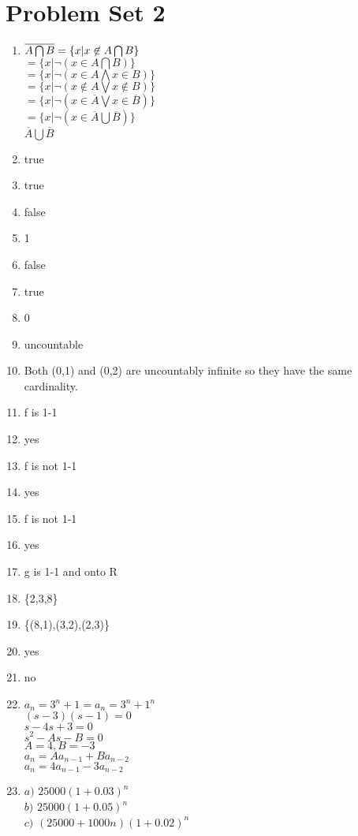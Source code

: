 \documentclass[11pt]{article}
\begin{document}
\section{Problem Set 2}
\begin{enumerate}
\item $\overline{A \bigcap B} \\= \lbrace x | x \not\in A \bigcap B\rbrace$
\\$= \lbrace x | \lnot(x \in A \bigcap B)\rbrace$
\\$= \lbrace x | \lnot(x \in A \bigwedge x \in B)\rbrace$
\\$= \lbrace x | \lnot(x \not\in A \bigvee x \not\in B)\rbrace$
\\$= \lbrace x | \lnot(x \in \overline{A} \bigvee x \in \overline{B})\rbrace$
\\$= \lbrace x | \lnot(x \in \overline{A} \bigcup \overline{B})\rbrace$
\\$\overline{A} \bigcup \overline{B}$
\item true
\item true
\item false
\item 1
\item false
\item true
\item 0
\item uncountable
\item Both (0,1) and (0,2) are uncountably infinite so they have the same cardinality.
\item f is 1-1
\item yes
\item f is not 1-1
\item yes
\item f is not 1-1
\item yes
\item g is 1-1 and onto R
\item \{2,3,8\}
\item \{(8,1),(3,2),(2,3)\}
\item yes
\item no
\item $a_n = 3^n + 1 = a_n = 3^n + 1^n$\\
$(s-3)(s-1) = 0$\\
$s-4s+3=0$\\
$s^2-As-B = 0$\\
$A=4,B=-3$\\
$a_n = Aa_{n-1} + Ba_{n-2}$\\
$a_n = 4a_{n-1} - 3a_{n-2}$\\
\item $a)$ $25000(1 + 0.03)^n$\\
$b)$ $25000(1 + 0.05)^n$\\
$c)$ $(25000+1000n)(1 + 0.02)^n$
\end{enumerate}
\end{document}
